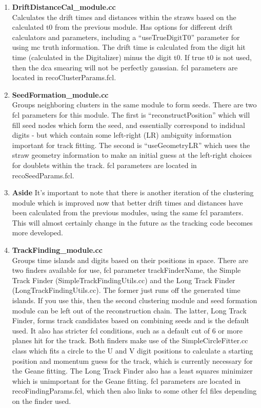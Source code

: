 \documentclass{article}
\begin{document}
\begin{enumerate}
          \item{\bf{DriftDistanceCal\_module.cc}} \\
          Calculates the drift times and distances within the straws based on the calculated t0 from the previous module. Has options for different drift calculators and parameters, including a ``useTrueDigitT0'' parameter for using mc truth information. The drift time is calculated from the digit hit time (calculated in the Digitalizer) minus the digit t0. If true t0 is not used, then the dca smearing will not be perfectly gaussian. fcl parameters are located in recoClusterParams.fcl.

          \item{\bf{SeedFormation\_module.cc}} \\
          Groups neighboring clusters in the same module to form seeds. There are two fcl parameters for this module. The first is ``reconstructPosition'' which will fill seed nodes which form the seed, and essentially correspond to indidual digits - but which contain some left-right (LR) ambiguity information important for track fitting. The second is ``useGeometryLR'' which uses the straw geometry information to make an initial guess at the left-right choices for doublets within the track. fcl parameters are located in recoSeedParams.fcl.

          \item{\bf{Aside}}
          It's important to note that there is another iteration of the clustering module which is improved now that better drift times and distances have been calculated from the previous modules, using the same fcl paramters. This will almost certainly change in the future as the tracking code becomes more developed.

          \item{\bf{TrackFinding\_module.cc}} \\
          Groups time islands and digits based on their positions in space. There are two finders available for use, fcl parameter trackFinderName, the Simple Track Finder (SimpleTrackFindingUtils.cc) and the Long Track Finder (LongTrackFindingUtils.cc). The former just runs off the generated time islands. If you use this, then the second clustering module and seed formation module can be left out of the reconstruction chain. The latter, Long Track Finder, forms track candidates based on combining seeds and is the default used. It also has stricter fcl conditions, such as a default cut of 6 or more planes hit for the track. Both finders make use of the SimpleCircleFitter.cc class which fits a circle to the U and V digit positions to calculate a starting position and momentum guess for the track, which is currently necessary for the Geane fitting. The Long Track Finder also has a least squares minimizer which is unimportant for the Geane fitting. fcl parameters are located in recoFindingParams.fcl, which then also links to some other fcl files depending on the finder used.


    \end{enumerate}
\end{document}
